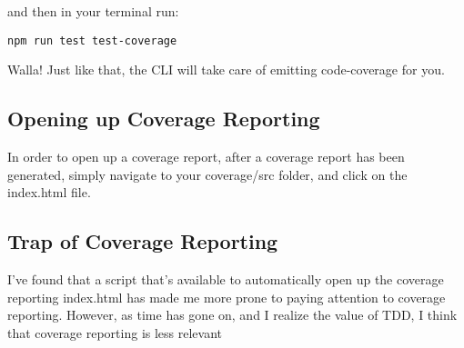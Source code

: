 and then in your terminal run:
\begin{verbatim}
npm run test test-coverage
\end{verbatim}

Walla! Just like that, the CLI will take care of emitting code-coverage for you.

\subsection{ Opening up Coverage Reporting }
In order to open up a coverage report, after a coverage report has been
generated, simply navigate to your coverage/src folder, and click on the
index.html file.

\subsection{ Trap of Coverage Reporting }
I've found that a script that's available to automatically
open up the coverage reporting index.html has made me more prone to paying
attention to coverage reporting. However, as time has gone on, and I realize the
value of TDD, I think that coverage reporting is less relevant
